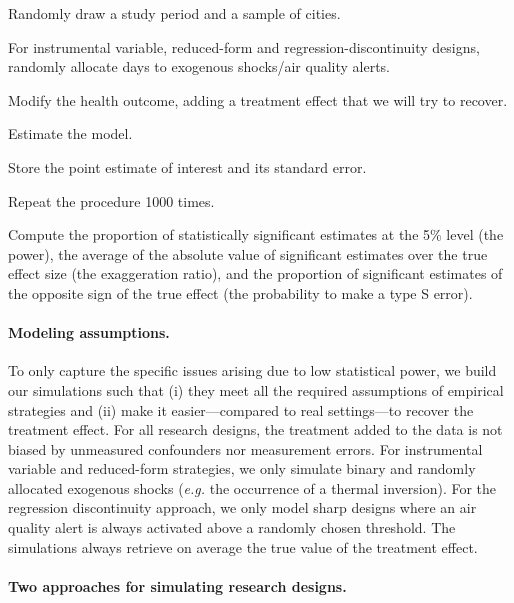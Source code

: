 \documentclass[12pt]{article}
\newenvironment{senumerate}{\enumerate\addtolength{\itemsep}{-10pt}}{\endenumerate} %
\begin{document}
        \begin{sloppypar}
        \begin{senumerate}
            \item Randomly draw a study period and a sample of cities.
            \item For instrumental variable, reduced-form and regression-discontinuity designs, randomly allocate days to exogenous shocks/air quality alerts.
            \item Modify the health outcome, adding a treatment effect that we will try to recover.
            \item Estimate the model.
            \item Store the point estimate of interest and its standard error.
            \item Repeat the procedure 1000 times.
            \item Compute the proportion of statistically significant estimates at the 5\% level (the power), the average of the absolute value of significant estimates over the true effect size (the exaggeration ratio), and the proportion of significant estimates of the opposite sign of the true effect (the probability to make a type S error). 
        \end{senumerate}
        \end{sloppypar}
        
        \paragraph{Modeling assumptions.} To only capture the specific issues arising due to low statistical power, we build our simulations such that (i) they meet all the required assumptions of empirical strategies and (ii) make it easier---compared to real settings---to recover the treatment effect. For all research designs, the treatment added to the data is not biased by unmeasured confounders nor measurement errors. For instrumental variable and reduced-form strategies, we only simulate binary and randomly allocated exogenous shocks (\textit{e.g.} the occurrence of a thermal inversion). For the regression discontinuity approach, we only model sharp designs where an air quality alert is always activated above a randomly chosen threshold. The simulations always retrieve on average the true value of the treatment effect.
     
        \paragraph{Two approaches for simulating research designs.}
\end{document}
